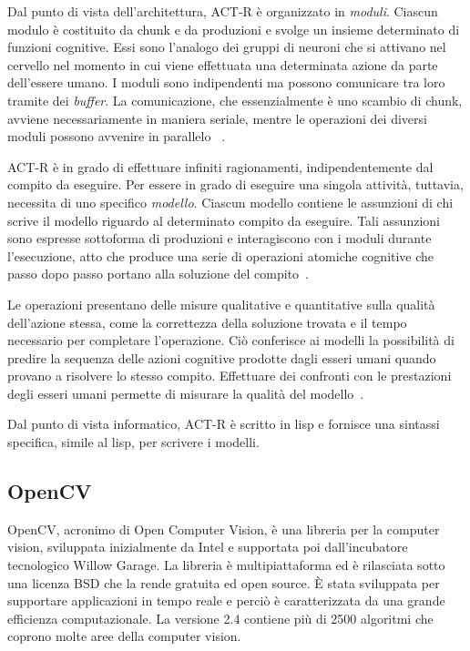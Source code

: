 				Dal punto di vista dell'architettura, \mbox{ACT-R} è organizzato in \emph{moduli}.
				Ciascun modulo è costituito da chunk e da produzioni e svolge un insieme determinato di funzioni cognitive. 
				Essi sono l'analogo dei gruppi di neuroni che si attivano nel cervello nel momento in cui viene effettuata una determinata azione da parte dell'essere umano.
				I moduli sono indipendenti ma possono comunicare tra loro tramite dei \emph{buffer}. 
				La comunicazione, che essenzialmente è uno scambio di chunk, avviene necessariamente in maniera seriale, mentre le operazioni dei diversi moduli possono avvenire in parallelo ~\cite{actr6refman}.
				
				\mbox{ACT-R} è in grado di effettuare infiniti ragionamenti, indipendentemente dal compito da eseguire. 
				Per essere in grado di eseguire una singola attività, tuttavia, necessita di uno specifico \emph{modello}.
				Ciascun modello contiene le assunzioni di chi scrive il modello riguardo al determinato compito da eseguire.
				Tali assunzioni sono espresse sottoforma di produzioni e interagiscono con i moduli durante l'esecuzione, atto che produce una serie di operazioni atomiche cognitive che passo dopo passo portano alla soluzione del compito~\cite{Sears2012}. 
				
				Le operazioni presentano delle misure qualitative e quantitative sulla qualità dell'azione stessa, come la correttezza della soluzione trovata e il tempo necessario per completare l'operazione. 
				Ciò conferisce ai modelli la possibilità di predire la sequenza delle azioni cognitive prodotte dagli esseri umani quando provano a risolvere lo stesso compito. 
				Effettuare dei confronti con le prestazioni degli esseri umani permette di misurare la qualità del modello~\cite{Sears2012}.

				Dal punto di vista informatico, \mbox{ACT-R} è scritto in lisp e fornisce una sintassi specifica, simile al lisp, per scrivere i modelli.

			\subsection*{OpenCV}
				\mbox{OpenCV}, acronimo di Open Computer Vision, è una libreria per la computer vision, sviluppata inizialmente da Intel e supportata poi dall'incubatore tecnologico Willow Garage.
				La libreria è multipiattaforma ed è rilasciata sotto una licenza BSD che la rende gratuita ed open source. 
				È stata sviluppata per supportare applicazioni in tempo reale e perciò è caratterizzata da una grande efficienza computazionale.
				La versione 2.4 contiene più di 2500 algoritmi che coprono molte aree della computer vision.


